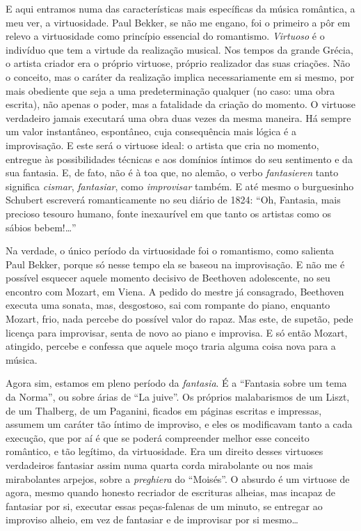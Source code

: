 E aqui entramos numa das características mais específicas da música
romântica, a meu ver, a virtuosidade. Paul Bekker, se não me engano, foi
o primeiro a pôr em relevo a virtuosidade como princípio essencial do
romantismo. \textit{Virtuoso} é o indivíduo que tem a virtude da realização
musical. Nos tempos da grande Grécia, o artista criador era o próprio
virtuose, próprio realizador das suas criações. Não o conceito, mas o
caráter da realização implica necessariamente em si mesmo, por mais
obediente que seja a uma predeterminação qualquer (no caso: uma obra
escrita), não apenas o poder, mas a fatalidade da criação do momento. O
virtuose verdadeiro jamais executará uma obra duas vezes da mesma
maneira. Há sempre um valor instantâneo, espontâneo, cuja consequência
mais lógica é a improvisação. E este será o virtuose ideal: o artista
que cria no momento, entregue às possibilidades técnicas e aos domínios
íntimos do seu sentimento e da sua fantasia. E, de fato, não é à toa
que, no alemão, o verbo \textit{fantasieren} tanto significa \textit{cismar},
\textit{fantasiar}, como \textit{improvisar} também. E até mesmo o burguesinho
Schubert escreverá romanticamente no seu diário de 1824: ``Oh, Fantasia,
mais precioso tesouro humano, fonte inexaurível em que tanto os artistas
como os sábios bebem!\ldots{}''

Na verdade, o único período da virtuosidade foi o romantismo, como
salienta Paul Bekker, porque só nesse tempo ela se baseou na
improvisação. E não me é possível esquecer aquele momento decisivo de
Beethoven adolescente, no seu encontro com Mozart, em Viena. A pedido do
mestre já consagrado, Beethoven executa uma sonata, mas, desgostoso, sai
com rompante do piano, enquanto Mozart, frio, nada percebe do possível
valor do rapaz. Mas este, de supetão, pede licença para improvisar,
senta de novo ao piano e improvisa. E só então Mozart, atingido, percebe
e confessa que aquele moço traria alguma coisa nova para a música.

Agora sim, estamos em pleno período da \textit{fantasia}. É a ``Fantasia
sobre um tema da Norma'', ou sobre árias de ``La juive''. Os próprios
malabarismos de um Liszt, de um Thalberg, de um Paganini, ficados em
páginas escritas e impressas, assumem um caráter tão íntimo de
improviso, e eles os modificavam tanto a cada execução, que por aí é que
se poderá compreender melhor esse conceito romântico, e tão legítimo, da
virtuosidade. Era um direito desses virtuoses verdadeiros fantasiar
assim numa quarta corda mirabolante ou nos mais mirabolantes arpejos,
sobre a \textit{preghiera} do ``Moisés''. O absurdo é um virtuose de agora, mesmo
quando honesto recriador de escrituras alheias, mas incapaz de
fantasiar por si, executar essas peças-falenas de um minuto, se entregar
ao improviso alheio, em vez de fantasiar e de improvisar por si mesmo\ldots{}

